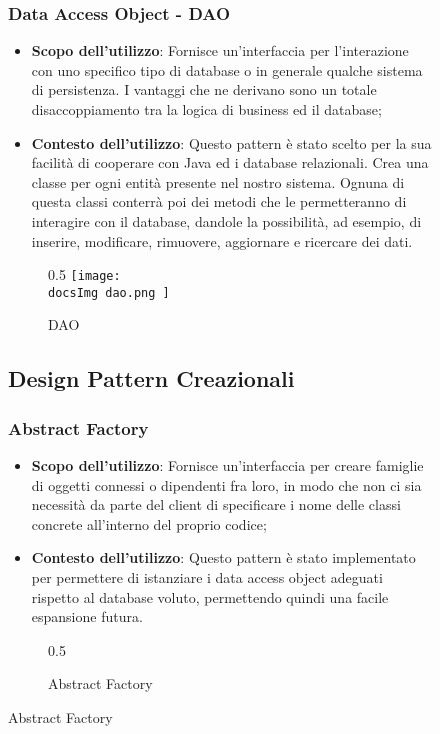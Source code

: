 \begin{figure}
		\subsubsection{Data Access Object - DAO }
		\begin{itemize}\itemsep1pt
				\item \textbf{Scopo dell'utilizzo}: Fornisce un'interfaccia per l'interazione con uno specifico tipo di database o in generale qualche sistema di persistenza. I vantaggi che ne derivano sono un totale disaccoppiamento tra la logica di business ed il database;
				\item \textbf{Contesto dell'utilizzo}: Questo pattern è stato scelto per la sua facilità di cooperare con Java ed i database relazionali. Crea una classe per ogni entità presente nel nostro sistema. Ognuna di questa classi conterrà poi dei metodi che le permetteranno di interagire con il database, dandole la possibilità, ad esempio, di inserire, modificare, rimuovere, aggiornare e ricercare dei dati.
		\end{itemize}
		\begin{figure}[h]{0.5}
			\centering
			\texttt{[image: \\docsImg dao.png ]}
			\caption{DAO}
			\label{fig. Data Access Object - DAO}
		\end{figure}
	\subsection{Design Pattern Creazionali}
		
		\subsubsection{Abstract Factory }
		\begin{itemize}\itemsep1pt
			\item \textbf{Scopo dell'utilizzo}: Fornisce un'interfaccia per creare famiglie di oggetti connessi o dipendenti fra loro, in modo che non ci sia necessità da parte del client di specificare i nome delle classi concrete all'interno del proprio codice;
			\item \textbf{Contesto dell'utilizzo}: Questo pattern è stato implementato per permettere di istanziare i data access object adeguati rispetto al database voluto, permettendo quindi una facile espansione futura. 
		\end{itemize}
		\begin{figure}[h]{0.5}
			\centering
			\caption{Abstract Factory}
			\label{fig. Abstract Factory}
		\end{figure}
		

\end{figure}
